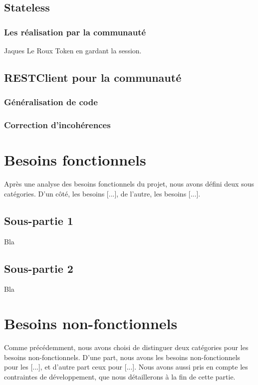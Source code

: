 \subsection{Stateless}
\subsubsection{Les réalisation par la communauté}

Jaques Le Roux Token en gardant la session.
\subsection{RESTClient pour la communauté}
\subsubsection{Généralisation de code}
\subsubsection{Correction d'incohérences}



\iffalse
\section{Besoins fonctionnels}

Après une analyse des besoins fonctionnels du projet, nous avons défini deux sous catégories. D'un côté, les besoins [...], de l'autre, les besoins [...].

\subsection{Sous-partie 1}

Bla

\subsection{Sous-partie 2}

Bla

\newpage

\section{Besoins non-fonctionnels}

Comme précédemment, nous avons choisi de distinguer deux catégories pour les besoins non-fonctionnels. D'une part, nous avons les besoins non-fonctionnels pour les [...], et d'autre part ceux pour [...]. Nous avons aussi pris en compte les contraintes de développement, que nous détaillerons à la fin de cette partie.

